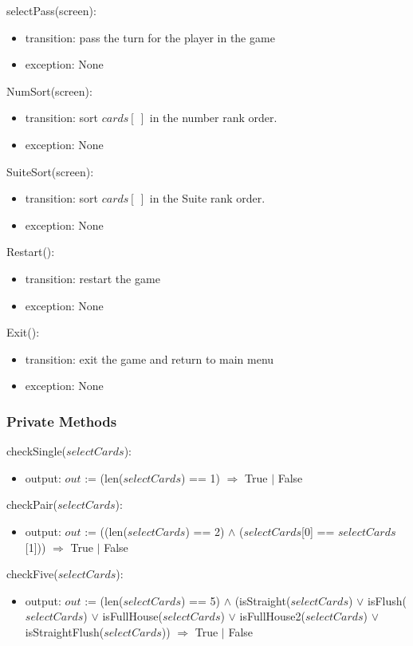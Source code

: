 \documentclass[12pt, titlepage]{article}
\begin{document}
selectPass(screen):
\begin{itemize}
    \item transition: pass the turn for the player in the game
    \item exception: None
\end{itemize}

NumSort(screen):
\begin{itemize}
    \item transition: sort $cards[\ ]$ in the number rank order.
    \item exception: None
\end{itemize}

SuiteSort(screen):
\begin{itemize}
    \item transition: sort $cards[\ ]$ in the Suite rank order.
    \item exception: None
\end{itemize}

Restart():
\begin{itemize}
    \item transition: restart the game
    \item exception: None
\end{itemize}

Exit():
\begin{itemize}
    \item transition: exit the game and return to main menu
    \item exception: None
\end{itemize}

\subsubsection{Private Methods}
checkSingle($selectCards$):
\begin{itemize}
    \item output: $out$ := (len($selectCards$) == 1) $\Rightarrow$ True $\mid$ False
\end{itemize}

checkPair($selectCards$):
\begin{itemize}
    \item output: $out$ := ((len($selectCards$) == 2) $\land$ ($selectCards$[0] == $selectCards$[1])) $\Rightarrow$ True $\mid$ False
\end{itemize}

checkFive($selectCards$):
\begin{itemize}
    \item output: $out$ := (len($selectCards$) == 5) $\land$ (isStraight($selectCards$) $\lor$ isFlush($selectCards$) $\lor$ isFullHouse($selectCards$) $\lor$ isFullHouse2($selectCards$) $\lor$ isStraightFlush($selectCards$)) $\Rightarrow$ True $\mid$ False
\end{itemize}
\end{document}
